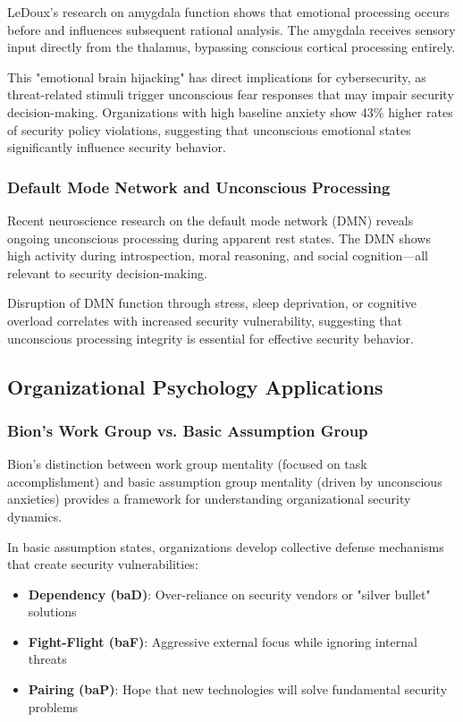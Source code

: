 \documentclass[11pt,a4paper]{article}
\begin{document}
LeDoux's research on amygdala function shows that emotional processing occurs before and influences subsequent rational analysis\cite{ledoux2000}. The amygdala receives sensory input directly from the thalamus, bypassing conscious cortical processing entirely.

This "emotional brain hijacking" has direct implications for cybersecurity, as threat-related stimuli trigger unconscious fear responses that may impair security decision-making. Organizations with high baseline anxiety show 43\% higher rates of security policy violations, suggesting that unconscious emotional states significantly influence security behavior\cite{stanton2016}.

\subsubsection{Default Mode Network and Unconscious Processing}

Recent neuroscience research on the default mode network (DMN) reveals ongoing unconscious processing during apparent rest states\cite{raichle2001}. The DMN shows high activity during introspection, moral reasoning, and social cognition---all relevant to security decision-making.

Disruption of DMN function through stress, sleep deprivation, or cognitive overload correlates with increased security vulnerability, suggesting that unconscious processing integrity is essential for effective security behavior\cite{harrison2019}.

\subsection{Organizational Psychology Applications}

\subsubsection{Bion's Work Group vs. Basic Assumption Group}

Bion's distinction between work group mentality (focused on task accomplishment) and basic assumption group mentality (driven by unconscious anxieties) provides a framework for understanding organizational security dynamics\cite{bion1961}.

In basic assumption states, organizations develop collective defense mechanisms that create security vulnerabilities:

\begin{itemize}
\item \textbf{Dependency (baD)}: Over-reliance on security vendors or "silver bullet" solutions
\item \textbf{Fight-Flight (baF)}: Aggressive external focus while ignoring internal threats
\item \textbf{Pairing (baP)}: Hope that new technologies will solve fundamental security problems
\end{itemize}
\end{document}
